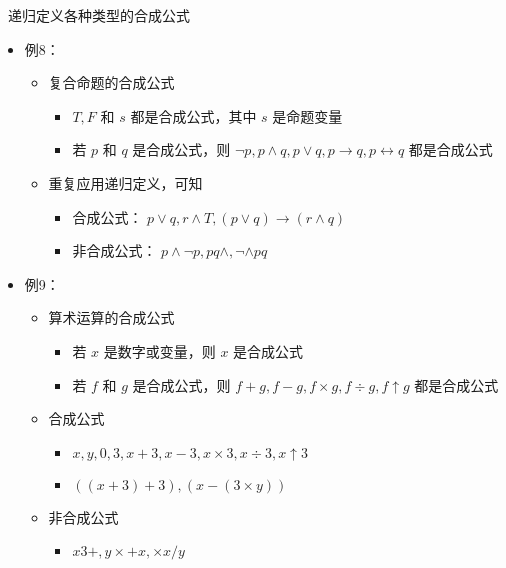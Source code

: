 \documentclass[UTF8]{report}
\theoremstyle{MyLineTheoremStyle} %
\theoremstyle{MyBlockTheoremStyle} %
\theoremstyle{MySubsubsectionStyle} %
\begin{document}
\textbullet\ 递归定义各种类型的合成公式
\begin{itemize}
    \item 例8：
    \begin{itemize}
        \item 复合命题的合成公式
        \begin{itemize}
            \item $T, F$ 和 $s$ 都是合成公式，其中 $s$ 是命题变量
            \item 若 $p$ 和 $q$ 是合成公式，则 $\neg p , p \land q , p \lor q , p \rightarrow q , p \leftrightarrow q$ 都是合成公式
        \end{itemize}
        \item 重复应用递归定义，可知
        \begin{itemize}
            \item 合成公式： $p \lor q , r \land T , (p \lor q) \rightarrow (r \land q)$
            \item 非合成公式： $p \land \neg p, pq \land, \neg \land pq$
        \end{itemize}
    \end{itemize}
    \item 例9：
    \begin{itemize}
        \item 算术运算的合成公式
        \begin{itemize}
            \item 若 $x$ 是数字或变量，则 $x$ 是合成公式
            \item 若 $f$ 和 $g$ 是合成公式，则 $f + g , f - g , f \times g , f \div g, f \uparrow g$ 都是合成公式
        \end{itemize}
        \item 合成公式
        \begin{itemize}
            \item $x, y, 0, 3, x + 3 , x - 3 , x \times 3 , x \div 3 , x \uparrow 3$
            \item $((x + 3) + 3) , (x - (3 \times y))$
        \end{itemize}
        \item 非合成公式
        \begin{itemize}
            \item $x3+, y \times +x, \times x/y$
        \end{itemize}
    \end{itemize}
\end{itemize}
\end{document}
